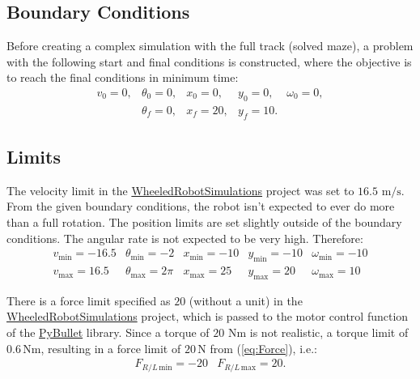 \documentclass[12pt]{article}
\numberwithin{equation}{section} %
\numberwithin{figure}{section} %
\begin{document}
\subsection{Boundary Conditions}

Before creating a complex simulation with the full track (solved maze), a problem with the following start and final conditions is constructed, where the objective is to reach the final conditions in minimum time:
\begin{equation}
	\begin{matrix}
		v_0 = 0, & \theta_0 = 0, & x_0 = 0, & y_0 = 0, & \omega_0 = 0, \\
		& \theta_f = 0, & x_f = 20, & y_f = 10. &
	\end{matrix} \nonumber
\end{equation}

\subsection{Limits}
\label{sec:Limits}

The velocity limit in the {\color{blue} \href{https://github.com/Yurof/WheeledRobotSimulations}{WheeledRobotSimulations}} project was set to $16.5$ $\mathrm{m/s}$. From the given boundary conditions, the robot isn't expected to ever do more than a full rotation. The position limits are set slightly outside of the boundary conditions. The angular rate is not expected to be very high. Therefore:
\begin{equation}
	\begin{matrix}
		v_\mathrm{min} = -16.5 & \theta_\mathrm{min} = - 2 & x_\mathrm{min} = - 10 & y_\mathrm{min} = - 10 & \omega_\mathrm{min} = - 10 \\
		v_\mathrm{max} = 16.5 & \theta_\mathrm{max} = 2 \pi & x_\mathrm{max} = 25 & y_\mathrm{max} = 20 & \omega_\mathrm{max} = 10
	\end{matrix} \nonumber
\end{equation}

There is a force limit specified as $20$ (without a unit) in the {\color{blue} \href{https://github.com/Yurof/WheeledRobotSimulations}{WheeledRobotSimulations}} project, which is passed to the motor control function of the {\color{blue} \href{https://github.com/bulletphysics/bullet3}{PyBullet}} library. Since a torque of  $20$ $\mathrm{Nm}$ is not realistic, a torque limit of $0.6 \, \mathrm{Nm}$, resulting in a force limit of $20 \, \mathrm{N}$ from (\ref{eq:Force}), i.e.:
\begin{equation}
	\begin{matrix}
		F_{R/L \, \mathrm{min}} = -20 & F_{R/L \, \mathrm{max}} = 20.
	\end{matrix} \nonumber
\end{equation}
\end{document}

